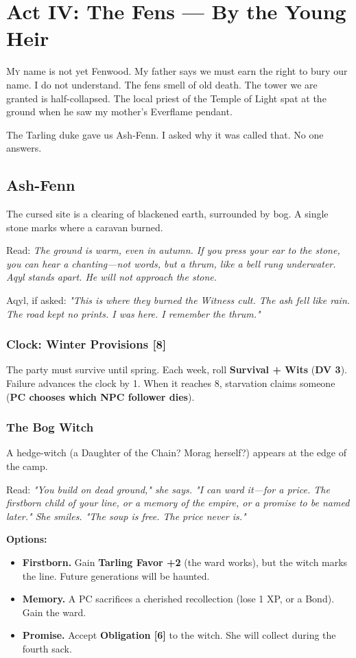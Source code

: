 \documentclass[11pt]{book}
\begin{document}
\clearpage

\chapter{Act IV: The Fens --- By the Young Heir}

\lettrine{M}{y} name is not yet Fenwood. My father says we must earn the right to bury our name. I do not understand. The fens smell of old death. The tower we are granted is half-collapsed. The local priest of the Temple of Light spat at the ground when he saw my mother's Everflame pendant.

The Tarling duke gave us Ash-Fenn. I asked why it was called that. No one answers.

\section*{Ash-Fenn}
The cursed site is a clearing of blackened earth, surrounded by bog. A single stone marks where a caravan burned.

Read:
\emph{The ground is warm, even in autumn. If you press your ear to the stone, you can hear a chanting---not words, but a thrum, like a bell rung underwater. Aqyl stands apart. He will not approach the stone.}

Aqyl, if asked: \emph{"This is where they burned the Witness cult. The ash fell like rain. The road kept no prints. I was here. I remember the thrum."}

\subsection*{Clock: Winter Provisions [8]}
The party must survive until spring. Each week, roll \textbf{Survival + Wits} (\textbf{DV 3}). Failure advances the clock by 1. When it reaches 8, starvation claims someone (\textbf{PC chooses which NPC follower dies}).

\subsection*{The Bog Witch}
A hedge-witch (a Daughter of the Chain? Morag herself?) appears at the edge of the camp.

Read:
\emph{"You build on dead ground," she says. "I can ward it---for a price. The firstborn child of your line, or a memory of the empire, or a promise to be named later." She smiles. "The soup is free. The price never is."}

\textbf{Options:}
\begin{itemize}
    \item \textbf{Firstborn.} Gain \textbf{Tarling Favor +2} (the ward works), but the witch marks the line. Future generations will be haunted.
    \item \textbf{Memory.} A PC sacrifices a cherished recollection (lose 1 XP, or a Bond). Gain the ward.
    \item \textbf{Promise.} Accept \textbf{Obligation [6]} to the witch. She will collect during the fourth sack.
\end{itemize}
\end{document}
